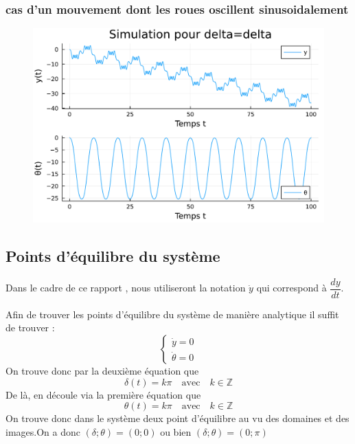 \documentclass[11pt,a4paper]{article}
\begin{document}
\subsubsection{cas d'un mouvement dont les roues oscillent sinusoidalement}
\begin{figure}[!h]
	\centering
	\includegraphics[width=0.5\linewidth]{../code/jlplots/Q1_3_delta.pdf}
\end{figure}
\subsection{Points d'équilibre du système}
\begin{displayquote}
Dans le cadre de ce rapport , nous utiliseront la notation $\dot y$ qui correspond à $\dfrac{d y}{dt}$.
\end{displayquote}
Afin de trouver les points d'équilibre du système de manière analytique il suffit de trouver :
\begin{equation}
	\begin{cases}
		\dot y=0 \\
		\dot \theta=0%
	\end{cases}
\end{equation}
On trouve donc par la deuxième équation que
$$\delta(t) = k\pi \quad \text{avec} \quad k \in \mathbb{Z}$$
De là, en découle via la première équation que
$$\theta(t)=k\pi \quad \text{avec} \quad k \in \mathbb{Z}$$
On trouve donc dans le système deux point d'équilibre au vu des domaines et des images.On a donc $(\delta;\theta)=(0;0)$ ou bien $(\delta;\theta)=(0;\pi)$
\end{document}
